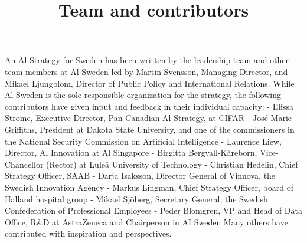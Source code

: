 \title{
Team and contributors
}
An Al Strategy for Sweden has been written by the leadership team and other team members at Al Sweden led by Martin Svensson, Managing Director, and Mikael Ljungblom, Director of Public Policy and International Relations.
While Al Sweden is the sole responsible organization for the strategy, the following contributors have given input and feedback in their individual capacity:
- Elissa Strome, Executive Director, Pan-Canadian Al Strategy, at CIFAR
- José-Marie Griffiths, President at Dakota State University, and one of the commissioners in the National Security Commission on Artificial Intelligence
- Laurence Liew, Director, Al Innovation at Al Singapore
- Birgitta Bergvall-Kåreborn, Vice-Chancellor (Rector) at Luleå University of Technology
- Christian Hedelin, Chief Strategy Officer, SAAB
- Darja Isaksson, Director General of Vinnova, the Swedish Innovation Agency
- Markus Lingman, Chief Strategy Officer, board of Halland hospital group
- Mikael Sjöberg, Secretary General, the Swedish Confederation of Professional Employees
- Peder Blomgren, VP and Head of Data Office, R\&D at AstraZeneca and Chairperson in AI Sweden
Many others have contributed with inspiration and perspectives.